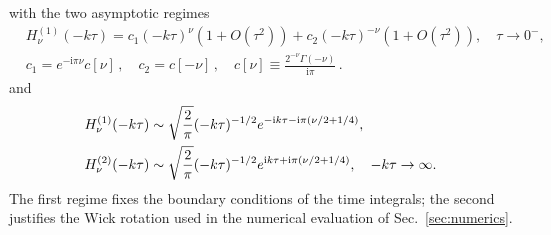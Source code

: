 \documentclass[11pt,a4paper]{article}
\numberwithin{table}{section}
\newcommand{\ii}{\mathrm i}
\def\ie{\begin{equation}\begin{aligned}}
\def\fe{\end{aligned}\end{equation}}
\begin{document}
with the two asymptotic regimes
\ie
  &H^{(1)}_\nu(-k\tau)=c_1(-k\tau)^\nu(1+O(\tau^2))+c_2(-k\tau)^{-\nu}(1+O(\tau^2)),
  \quad \tau\to0^-,\\
&c_1=e^{-\ii\pi\nu}c[\nu]\,, \quad c_2=c[-\nu]\,, \quad
c[\nu]\equiv \frac{ 2^{-\nu } \Gamma (-\nu )}{\ii \pi }  \, .
  \label{eq:hankel-tau0}
\fe
and
\begin{align}
  &H^{(1)}_\nu(-k\tau)\sim\sqrt{\frac2\pi}(-k\tau)^{-1/2}
  e^{-\ii k\tau-\ii\pi(\nu/2+1/4)},\notag\\
  &H^{(2)}_\nu(-k\tau)\sim\sqrt{\frac2\pi}(-k\tau)^{-1/2}
  e^{\ii k\tau+\ii\pi(\nu/2+1/4)},
  \quad -k\tau\to\infty.
  \label{eq:hankel-infinity}
\end{align}
The first regime fixes the boundary conditions of the time integrals; the second justifies the
Wick rotation used in the numerical evaluation of Sec.~\ref{sec:numerics}.
\end{document}
